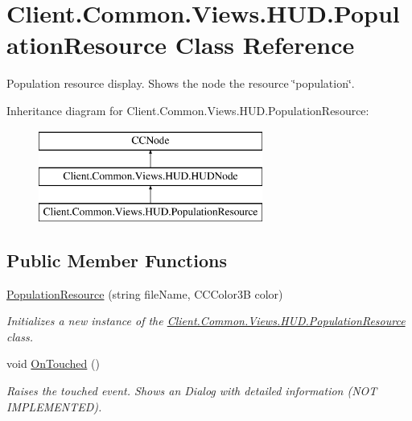 \hypertarget{classClient_1_1Common_1_1Views_1_1HUD_1_1PopulationResource}{}\section{Client.\+Common.\+Views.\+H\+U\+D.\+Population\+Resource Class Reference}
\label{classClient_1_1Common_1_1Views_1_1HUD_1_1PopulationResource}


Population resource display. Shows the node the resource \char`\"{}population\char`\"{}.  


Inheritance diagram for Client.\+Common.\+Views.\+H\+U\+D.\+Population\+Resource\+:\begin{figure}[H]
\begin{center}
\leavevmode
\includegraphics[height=3.000000cm]{classClient_1_1Common_1_1Views_1_1HUD_1_1PopulationResource}
\end{center}
\end{figure}
\subsection*{Public Member Functions}
\begin{DoxyCompactItemize}
\item 
\hyperlink{classClient_1_1Common_1_1Views_1_1HUD_1_1PopulationResource_a34fce1f70d8da46440900f3861559448}{Population\+Resource} (string file\+Name, C\+C\+Color3\+B color)
\begin{DoxyCompactList}\small\item\em Initializes a new instance of the \hyperlink{classClient_1_1Common_1_1Views_1_1HUD_1_1PopulationResource}{Client.\+Common.\+Views.\+H\+U\+D.\+Population\+Resource} class. \end{DoxyCompactList}\item 
void \hyperlink{classClient_1_1Common_1_1Views_1_1HUD_1_1PopulationResource_aedb4e7aefe45fc6f535068a1a093cc90}{On\+Touched} ()
\begin{DoxyCompactList}\small\item\em Raises the touched event. Shows an Dialog with detailed information (N\+O\+T I\+M\+P\+L\+E\+M\+E\+N\+T\+E\+D). \end{DoxyCompactList}\end{DoxyCompactItemize}

